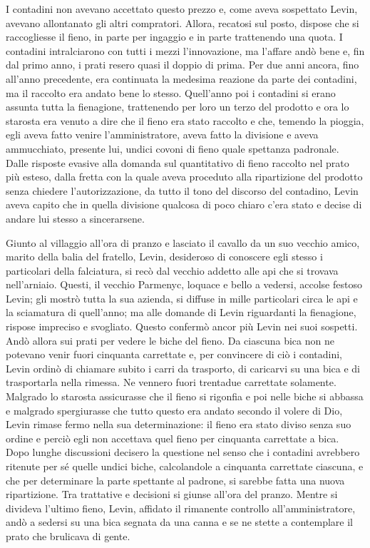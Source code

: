 I contadini non avevano accettato questo prezzo e, come aveva sospettato Levin, avevano allontanato gli altri compratori. Allora, recatosi sul posto, dispose che si raccogliesse il fieno, in parte per ingaggio e in parte trattenendo una quota. I contadini intralciarono con tutti i mezzi l'innovazione, ma l'affare andò bene e, fin dal primo anno, i prati resero quasi il doppio di prima. Per due anni ancora, fino all'anno precedente, era continuata la medesima reazione da parte dei contadini, ma il raccolto era andato bene lo stesso. Quell'anno poi i contadini si erano assunta tutta la fienagione, trattenendo per loro un terzo del prodotto e ora lo starosta era venuto a dire che il fieno era stato raccolto e che, temendo la pioggia, egli aveva fatto venire l'amministratore, aveva fatto la divisione e aveva ammucchiato, presente lui, undici covoni di fieno quale spettanza padronale. Dalle risposte evasive alla domanda sul quantitativo di fieno raccolto nel prato più esteso, dalla fretta con la quale aveva proceduto alla ripartizione del prodotto senza chiedere l'autorizzazione, da tutto il tono del discorso del contadino, Levin aveva capito che in quella divisione qualcosa di poco chiaro c'era stato e decise di andare lui stesso a sincerarsene. 

Giunto al villaggio all'ora di pranzo e lasciato il cavallo da un suo vecchio amico, marito della balia del fratello, Levin, desideroso di conoscere egli stesso i particolari della falciatura, si recò dal vecchio addetto alle api che si trovava nell'arniaio. Questi, il vecchio Parmenyc, loquace e bello a vedersi, accolse festoso Levin; gli mostrò tutta la sua azienda, si diffuse in mille particolari circa le api e la sciamatura di quell'anno; ma alle domande di Levin riguardanti la fienagione, rispose impreciso e svogliato. Questo confermò ancor più Levin nei suoi sospetti. Andò allora sui prati per vedere le biche del fieno. Da ciascuna bica non ne potevano venir fuori cinquanta carrettate e, per convincere di ciò i contadini, Levin ordinò di chiamare subito i carri da trasporto, di caricarvi su una bica e di trasportarla nella rimessa. Ne vennero fuori trentadue carrettate solamente. Malgrado lo starosta assicurasse che il fieno si rigonfia e poi nelle biche si abbassa e malgrado spergiurasse che tutto questo era andato secondo il volere di Dio, Levin rimase fermo nella sua determinazione: il fieno era stato diviso senza suo ordine e perciò egli non accettava quel fieno per cinquanta carrettate a bica. Dopo lunghe discussioni decisero la questione nel senso che i contadini avrebbero ritenute per sé quelle undici biche, calcolandole a cinquanta carrettate ciascuna, e che per determinare la parte spettante al padrone, si sarebbe fatta una nuova ripartizione. Tra trattative e decisioni si giunse all'ora del pranzo. Mentre si divideva l'ultimo fieno, Levin, affidato il rimanente controllo all'amministratore, andò a sedersi su una bica segnata da una canna e se ne stette a contemplare il prato che brulicava di gente. 

